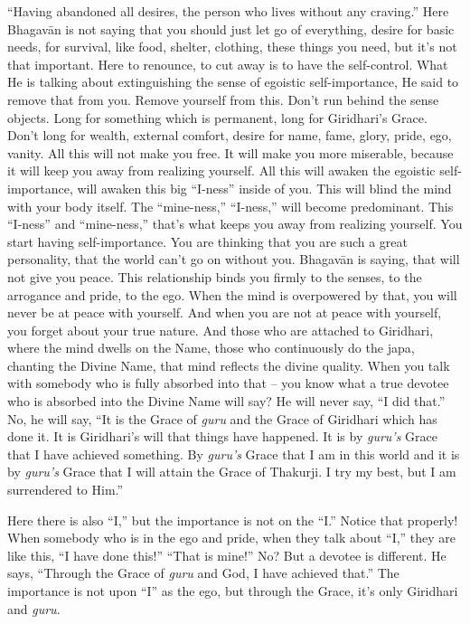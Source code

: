 “Having abandoned all desires, the person who lives without any craving.” Here Bhagavān is not saying that you should just let go of everything, desire for basic needs, for survival, like food, shelter, clothing, these things you need, but it’s not that important. Here to renounce, to cut away is to have the self-control. What He is talking about extinguishing the sense of egoistic self-importance, He said to remove that from you. Remove yourself from this. Don’t run behind the sense objects. Long for something which is permanent, long for Giridhari’s Grace. Don’t long for wealth, external comfort, desire for name, fame, glory, pride, ego, vanity. All this will not make you free. It will make you more miserable, because it will keep you away from realizing yourself. All this will awaken the egoistic self-importance, will awaken this big “I-ness” inside of you. This will blind the mind with your body itself. The “mine-ness,” “I-ness,” will become predominant. This “I-ness” and “mine-ness,” that’s what keeps you away from realizing yourself. You start having self-importance. You are thinking that you are such a great personality, that the world can’t go on without you. Bhagavān is saying, that will not give you peace. This relationship binds you firmly to the senses, to the arrogance and pride, to the ego. When the mind is overpowered by that, you will never be at peace with yourself. And when you are not at peace with yourself, you forget about your true nature. And those who are attached to Giridhari, where the mind dwells on the Name, those who continuously do the japa, chanting the Divine Name, that mind reflects the divine quality. When you talk with somebody who is fully absorbed into that – you know what a true devotee who is absorbed into the Divine Name will say? He will never say, “I did that.” No, he will say, “It is the Grace of \textit{guru} and the Grace of Giridhari which has done it. It is Giridhari’s will that things have happened. It is by \textit{guru’s} Grace that I have achieved something. By \textit{guru’s} Grace that I am in this world and it is by \textit{guru’s} Grace that I will attain the Grace of Thakurji. I try my best, but I am surrendered to Him.”

Here there is also “I,” but the importance is not on the “I.” Notice that properly! When somebody who is in the ego and pride, when they talk about “I,” they are like this, “I have done this!” “That is mine!” No? But a devotee is different. He says, “Through the Grace of \textit{guru} and God, I have achieved that.” The importance is not upon “I” as the ego, but through the Grace, it’s only Giridhari and \textit{guru}.


